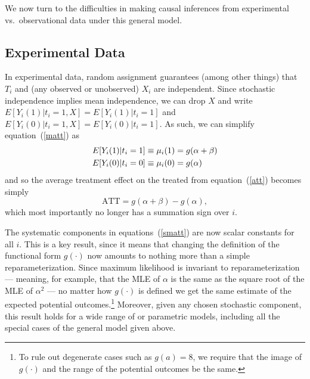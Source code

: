 \documentclass[11pt,titlepage]{article}
\begin{document}
We now turn to the difficulties in making causal inferences from
experimental vs.\ observational data under this general model.

\subsection{Experimental Data}\label{s:paraexp}

In experimental data, random assignment guarantees (among other
things) that $T_i$ and (any observed or unobserved) $X_i$ are
independent.  Since stochastic independence implies mean independence,
we can drop $X$ and write $E[Y_i(1)|t_i=1,X]=E[Y_i(1)|t_i=1]$ and
$E[Y_i(0)|t_i=1,X]=E[Y_i(0)|t_i=1]$.  As such, we can simplify
equation~(\ref{matt}) as
\begin{align}
  \label{smatt}
  E[Y_i(1)|t_i=1] &\equiv \mu_i(1) = g(\alpha + \beta)\notag \\
  E[Y_i(0)|t_i=0] &\equiv \mu_i(0) = g(\alpha)
\end{align}
and so the average treatment effect on the treated from
equation~(\ref{att}) becomes simply
\begin{equation}
  \label{satt}
  \text{ATT} = g(\alpha+\beta) - g(\alpha),
\end{equation}
which most importantly no longer has a summation sign over $i$.

The systematic components in equations~(\ref{smatt}) are now scalar
constants for all $i$.  This is a key result, since it means that
changing the definition of the functional form $g(\cdot)$ now amounts
to nothing more than a simple reparameterization.  Since maximum
likelihood is invariant to reparameterization --- meaning, for
example, that the MLE of $\alpha$ is the same as the square root of
the MLE of $\alpha^2$ \citep[][p.75--76]{King89} --- no matter how
$g(\cdot)$ is defined we get the same estimate of the expected
potential outcomes.\footnote{To rule out degenerate cases such as
  $g(a)=8$, we require that the image of $g(\cdot)$ and the range of
  the potential outcomes be the same.} Moreover, given any chosen
stochastic component, this result holds for a wide range of or
parametric models, including all the special cases of the general
model given above.
\end{document}
